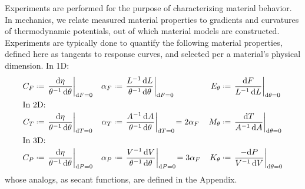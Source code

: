 Experiments are performed for the purpose of characterizing material behavior.  In mechanics, we relate measured material properties to gradients and curvatures of thermo\-dynamic potentials, out of which material models are constructed.  Experiments are typically done to quantify the following material properties, defined here as tangents to response curves, and selected per a material's physical dimension. 
\newline
In 1D:
\begin{subequations}
    \label{materialConstants}
    \begin{align}
    C_F & \defeq \left. \frac{\mathrm{d} \eta}
    {\theta^{-1} \, \mathrm{d}\theta} \right|_{\mathrm{d}F=0} & 
    \alpha_F & \defeq \left. \frac{L^{-1} \, \mathrm{d}L}
    {\theta^{-1} \, \mathrm{d} \theta} \right|_{\mathrm{d}F=0} &
    E_{\theta} & \defeq \left. \frac{\mathrm{d}F}
    {L^{-1} \, \mathrm{d}L} \right|_{\mathrm{d}\theta=0} \\
    \intertext{In 2D:}
    C_T & \defeq \left. \frac{\mathrm{d} \eta}
    {\theta^{-1} \, \mathrm{d}\theta} \right|_{\mathrm{d}T=0} & 
    \alpha_T & \defeq \left. \frac{A^{-1} \, \mathrm{d}A}
    {\theta^{-1} \, \mathrm{d} \theta} \right|_{\mathrm{d}T=0} \! =
    2 \alpha_F &
    M_{\theta} & \defeq \left. \frac{\mathrm{d}T}
    {A^{-1} \, \mathrm{d}A} \right|_{\mathrm{d}\theta=0} \\
    \intertext{In 3D:}
    C_P & \defeq \left. \frac{\mathrm{d} \eta}
    {\theta^{-1} \, \mathrm{d}\theta} \right|_{\mathrm{d}P=0} & 
    \alpha_P & \defeq \left. \frac{V^{-1} \, \mathrm{d}V}
    {\theta^{-1} \, \mathrm{d} \theta} \right|_{\mathrm{d}P=0} \! = 
    3 \alpha_F &
    K_{\theta} & \defeq \left. \frac{-\mathrm{d}P}
    {V^{-1} \, \mathrm{d}V} \right|_{\mathrm{d}\theta=0} 
    \end{align}
\end{subequations}
whose analogs, as secant functions, are defined in the Appendix.

